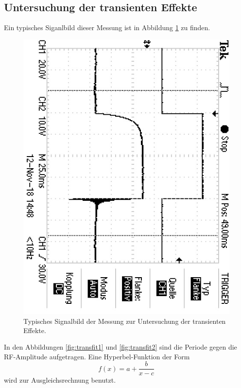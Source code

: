 \subsection{Untersuchung der transienten Effekte}
Ein typisches Siganlbild dieser Messung ist in Abbildung \ref{fig:trans} zu finden.
\begin{figure}
  \centering
  \includegraphics[angle=90]{pics/TEK0033.JPG}
  \caption{Typisches Signalbild der Messung zur Untersuchung der transienten Effekte.}
  \label{fig:trans}
\end{figure}
In den Abbildungen \ref{fig:transfit1} und \ref{fig:transfit2} sind die Periode
gegen die RF-Amplitude aufgetragen.
Eine Hyperbel-Funktion der Form
\begin{equation}
  f(x)=a+\frac{b}{x-c}
\end{equation}
wird zur Ausgleichsrechnung benutzt.
